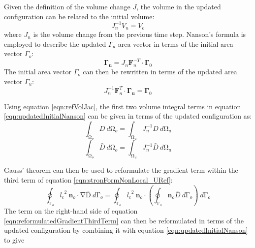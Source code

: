 \documentclass[sn-mathphys,Numbered,draft]{sn-jnl}%
\begin{document}
Given the definition of the volume change $J$, the volume in the updated configuration can be related to the initial volume:
\begin{equation}
\label{eqn:refVolJac}
    J^{-1}_nV_u=V_o
\end{equation}
where $J_n$ is the volume change from the previous time step.
Nanson's formula is employed to describe the updated $\Gamma_u$ area vector in terms of the initial area vector $\Gamma_o$:
\begin{equation}
    \mathbf{\Gamma_u}=J_n\mathbf{F}_n^{-T}\cdot\mathbf{\Gamma}_0
\end{equation}
The initial area vector $\Gamma_o$ can then be rewritten in terms of the updated area vector $\Gamma_u$:
\begin{equation}
\label{eqn:updatedInitialNanson}
    J^{-1}_n\mathbf{F}_n^{T}\cdot\mathbf{\Gamma_u}=\mathbf{\Gamma}_0
\end{equation}

Using equation \ref{eqn:refVolJac}, the first two volume integral terms in equation \ref{eqn:updatedInitialNanson} can be given in terms of the updated configuration as:
\begin{equation}
\int_{\mathrm{\Omega}_o}D\ d\mathrm{\Omega}_o=\int_{\mathrm{\Omega}_u}J^{-1}_nD\ d\mathrm{\Omega}_u
\end{equation}
\begin{equation}
\int_{\mathrm{\Omega}_o}\bar{D}\ d\mathrm{\Omega}_o=\int_{\mathrm{\Omega}_u}J^{-1}_n\bar{D}\ d\mathrm{\Omega}_u
\end{equation}

Gauss' theorem can then be used to reformulate the gradient term within the third term of equation \ref{eqn:stronFormNonLocal_URef}:
\begin{equation}
\label{eqn:reformulatedGradientThirdTerm}
\oint_{\mathrm{\Gamma}_o}{{l_c}^2\ \mathbf{n}_o\cdot\mathrm{\nabla}\mathrm{\bar{D}}}\ d\mathrm{\Gamma}_o=\oint_{\mathrm{\Gamma}_o}{{l_c}^2\ \mathbf{n}_o\cdot\left(\oint_{\mathrm{\Gamma}_o}\mathbf{n}_o\bar{D}\ d\mathrm{\Gamma}_o\right)}\ d\mathrm{\Gamma}_o
\end{equation}
The term on the right-hand side of equation \ref{eqn:reformulatedGradientThirdTerm} can then be reformulated in terms of the updated configuration by combining it with equation \ref{eqn:updatedInitialNanson} to give
\end{document}
